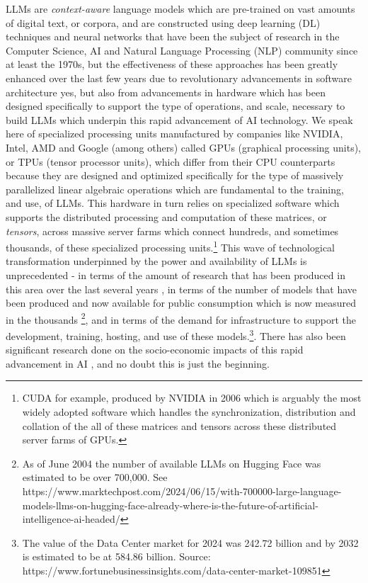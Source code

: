 \documentclass[final]{clv2025-revised}
\begin{document}
LLMs are \textit{context-aware} language models which are pre-trained on vast amounts of digital text, or corpora, and are constructed using deep learning (DL) techniques and neural networks that have been the subject of research in the Computer Science, AI and Natural Language Processing (NLP) community since at least the 1970s, but the effectiveness of these approaches has been greatly enhanced over the last few years due to revolutionary advancements in software architecture yes, but also from advancements in hardware which has been designed specifically to support the type of operations, and scale, necessary to build LLMs which underpin this rapid advancement of AI technology. We speak here of specialized processing units manufactured by companies like NVIDIA, Intel, AMD and Google (among others) called GPUs (graphical processing units), or TPUs (tensor processor units), which differ from their CPU counterparts because they are designed and optimized specifically for the type of massively parallelized linear algebraic operations which are fundamental to the training, and use, of LLMs. This hardware in turn relies on specialized software which supports the distributed processing and computation of these matrices, or \textit{tensors}, across massive server farms which connect hundreds, and sometimes thousands, of these specialized processing units.\footnote{CUDA for example, produced by NVIDIA in 2006 which is arguably the most widely adopted software which handles the synchronization, distribution and collation of the all of these matrices and tensors across these distributed server farms of GPUs.} This wave of technological transformation underpinned by the power and availability of LLMs is unprecedented - in terms of the amount of research that has been produced in this area over the last several years \cite{naveed2024comprehensiveoverviewlargelanguage} \cite{fan2023bibliometricreviewlargelanguage}, in terms of the number of models that have been produced and now available for public consumption which is now measured in the thousands \footnote{As of June 2004 the number of available LLMs on Hugging Face was estimated to be over 700,000. See https://www.marktechpost.com/2024/06/15/with-700000-large-language-models-llms-on-hugging-face-already-where-is-the-future-of-artificial-intelligence-ai-headed/}, and in terms of the demand for infrastructure to support the development, training, hosting, and use of these models.\footnote{The value of the Data Center market for 2024 was 242.72 billion and by 2032 is estimated to be at 584.86 billion. Source: https://www.fortunebusinessinsights.com/data-center-market-109851}. There has also been significant research done on the socio-economic impacts of this rapid advancement in AI \cite{10.1093/pnasnexus/pgae191} \cite{El-Farr24}, and no doubt this is just the beginning.
\end{document}
